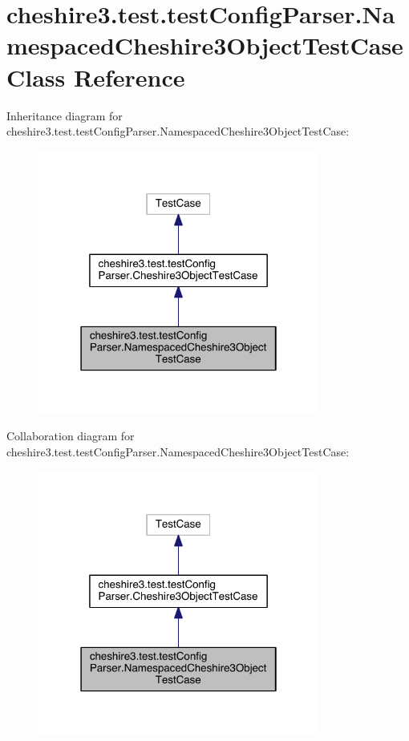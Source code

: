 \hypertarget{classcheshire3_1_1test_1_1test_config_parser_1_1_namespaced_cheshire3_object_test_case}{\section{cheshire3.\-test.\-test\-Config\-Parser.\-Namespaced\-Cheshire3\-Object\-Test\-Case Class Reference}
\label{classcheshire3_1_1test_1_1test_config_parser_1_1_namespaced_cheshire3_object_test_case}
}


Inheritance diagram for cheshire3.\-test.\-test\-Config\-Parser.\-Namespaced\-Cheshire3\-Object\-Test\-Case\-:
\nopagebreak
\begin{figure}[H]
\begin{center}
\leavevmode
\includegraphics[width=262pt]{classcheshire3_1_1test_1_1test_config_parser_1_1_namespaced_cheshire3_object_test_case__inherit__graph}
\end{center}
\end{figure}


Collaboration diagram for cheshire3.\-test.\-test\-Config\-Parser.\-Namespaced\-Cheshire3\-Object\-Test\-Case\-:
\nopagebreak
\begin{figure}[H]
\begin{center}
\leavevmode
\includegraphics[width=262pt]{classcheshire3_1_1test_1_1test_config_parser_1_1_namespaced_cheshire3_object_test_case__coll__graph}
\end{center}
\end{figure}

